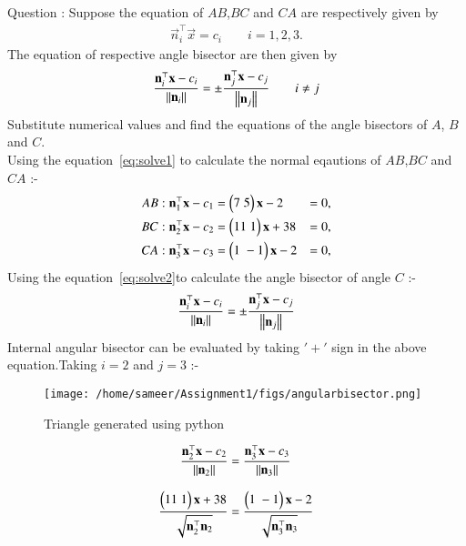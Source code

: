 \documentclass[journal,12pt,twocolumn]{IEEEtran}
\theoremstyle{remark}
\begin{document}
%
Question : Suppose the equation of $AB$,$BC$ and $CA$ are respectively given by 
\begin{align}
\label{eq:solve1}\vec{n}^{\top}_i\vec{x} = c_i\qquad i=1,2,3.
\end{align}
The equation of respective angle bisector are then given by 
\begin{align}
\label{eq:solve2}\dfrac{\mathbf{n}^{\top}_i\mathbf{x}-c_i}{\left\lVert\mathbf{n}_i\right\rVert} =  \pm\dfrac{\mathbf{n}^{\top}_j\mathbf{x}-c_j}{\left\lVert\mathbf{n}_j\right\rVert}\qquad i \neq j
\end{align}
Substitute numerical values and find the equations of the angle bisectors of $A$, $B$ and $C$.\\
\solution Using the equation~\eqref{eq:solve1} to calculate the normal eqautions of $AB$,$BC$ and $CA$ :-
\begin{align}
AB :   \mathbf{n}^{\top}_1\mathbf{x} - c_1  &=  \begin{pmatrix}7 \; 5\end{pmatrix}\mathbf{x} - 2 &=0,\\
BC :   \mathbf{n}^{\top}_2\mathbf{x} - c_2  &=  \begin{pmatrix}11 \; 1\end{pmatrix}\mathbf{x} + 38 &=0,\\
CA :   \mathbf{n}^{\top}_3\mathbf{x} - c_3  &=  \begin{pmatrix}1 \; -1\end{pmatrix}\mathbf{x} - 2 &=0,
\end{align}
Using the equation~\eqref{eq:solve2}to calculate the angle bisector of angle $C$ :-
\begin{align}
\dfrac{\mathbf{n}^{\top}_i\mathbf{x}-c_i}{\left\lVert\mathbf{n}_i\right\rVert} =  \pm\dfrac{\mathbf{n}^{\top}_j\mathbf{x}-c_j}{\left\lVert\mathbf{n}_j\right\rVert}
\end{align}
Internal angular bisector can be evaluated by taking $'+'$ sign in the above equation.Taking $i=2$ and $j=3$ :-
\begin{figure}
\centering
\texttt{[image: /home/sameer/Assignment1/figs/angularbisector.png]}
\caption{Triangle generated using python}
\label{fig: Angular bisector}
\end{figure}
\begin{align}
\dfrac{\mathbf{n}^{\top}_2\mathbf{x}-c_2}{\left\lVert\mathbf{n}_2\right\rVert} &=  \dfrac{\mathbf{n}^{\top}_3\mathbf{x}-c_3}{\left\lVert\mathbf{n}_3\right\rVert}\\[8pt]
\dfrac{\begin{pmatrix}11\;1\end{pmatrix}\mathbf{x}+38}{\sqrt{\mathbf{n}^{\top}_2\mathbf{n}_2}} &=  \dfrac{\begin{pmatrix}1\;-1\end{pmatrix}\mathbf{x}-2}{\sqrt{\mathbf{n}^{\top}_3 \mathbf{n}_3}}
\end{align}
\end{document}
